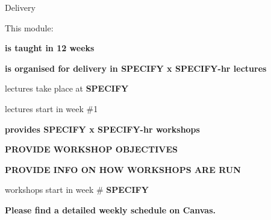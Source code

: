 \begin{frame}{Delivery}

This module:\\

\begin{itemize}
{\small
\item {\bf is taught in 12 weeks}
\vspace{0.1cm}
\item {\bf is organised for delivery in {\bf \color{red} SPECIFY} x {\bf \color{red} SPECIFY}-hr lectures}
  \begin{itemize}
  {\small
     \item lectures take place at {\bf \color{red} SPECIFY}
     \item lectures start in week \#1
  }
  \end{itemize}
\vspace{0.1cm}
\item {\bf provides {\bf \color{red} SPECIFY} x {\bf \color{red} SPECIFY}-hr workshops}
\begin{itemize}
{\small
   \item {\bf \color{red} PROVIDE WORKSHOP OBJECTIVES}
   \item {\bf \color{red} PROVIDE INFO ON HOW WORKSHOPS ARE RUN}
   \item workshops start in week \#{\bf \color{red} SPECIFY}
}
\end{itemize}
}
\end{itemize}

\begin{center}
{\bf
Please find a detailed weekly schedule on Canvas.\\
}
\end{center}
     
\end{frame}

